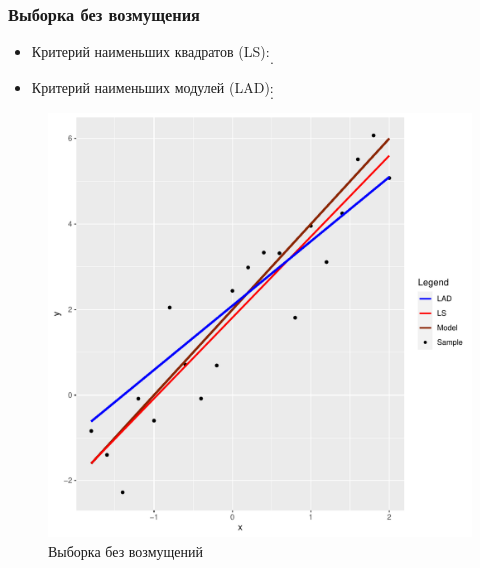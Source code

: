 \documentclass[a4paper]{article}
\begin{document}
\subsubsection{Выборка без возмущения}
\begin{itemize}
    \item Критерий наименьших квадратов (LS):
    \[
    .
    \]
    \item Критерий наименьших модулей (LAD):
    \[
    .
    \]
\end{itemize}
\begin{figure}[H]
    \centering
    \includegraphics[width = 12 cm ]{LabSrcs/resources/usual_sample_regression.pdf}
    \caption{Выборка без возмущений}
    \label{fig:usr}
\end{figure}
\end{document}
